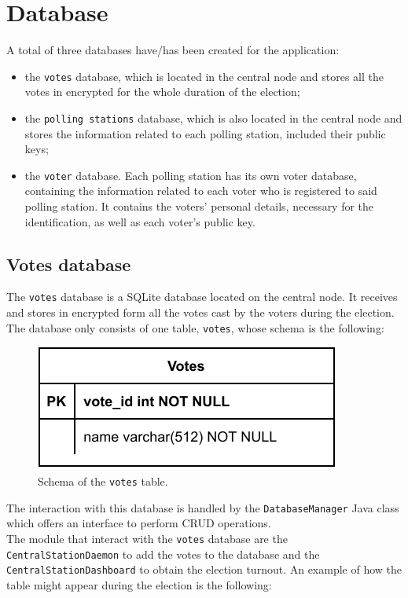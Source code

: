 %
\chapter{Database}\label{ch:database}
A total of three databases have/has been created for the application:
\begin{itemize}
	\item the \texttt{votes} database, which is located in the central node and stores all the votes in encrypted for the whole duration of the election;
	\item the \texttt{polling stations} database, which is also located in the central node and stores the information related to each polling station, included their public keys;
	\item the \texttt{voter} database. Each polling station has its own voter database, containing the information related to each voter who is registered to said polling station. It contains the voters' personal details, necessary for the identification, as well as each voter's public key.
\end{itemize}

\section{Votes database}\label{sec:votes_db}
The \texttt{votes} database is a SQLite database located on the central node. It receives and stores in encrypted form all the votes cast by the voters during the election.\\
The database only consists of one table, \texttt{votes}, whose schema is the following:\\
\begin{figure}[H]
    \begin{center}
        \includegraphics[scale=1]{img/votes_schema.pdf}
    \end{center}
    \vspace*{-0.5cm}
    \caption{Schema of the \texttt{votes} table.}
    \label{fig:votes_schema}
\end{figure}
The interaction with this database is handled by the \texttt{DatabaseManager} Java class which offers an interface to perform CRUD operations.\\
The module that interact with the \texttt{votes} database are the \texttt{CentralStationDaemon} to add the votes to the database and the \texttt{CentralStationDashboard} to obtain the election turnout. %
An example of how the table might appear during the election is the following:

